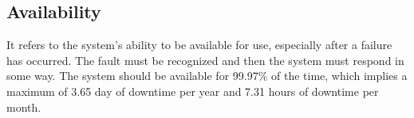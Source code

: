 \subsection{Availability}
It refers to the system’s ability to be available for use, especially after a failure has occurred. The fault must be recognized and then the system must
respond in some way. The system should be available for 99.97\% of the time, which implies a maximum of 3.65 day of downtime per year and 7.31 hours of downtime per month.